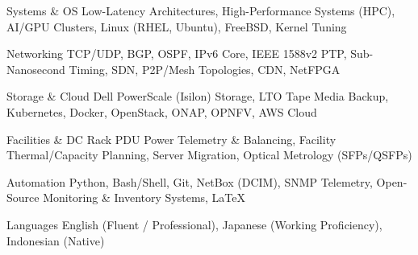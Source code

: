 

\begin{cvskills}

  \cvskill
    {Systems \& OS} %
    {Low-Latency Architectures, High-Performance Systems (HPC), AI/GPU Clusters, Linux (RHEL, Ubuntu), FreeBSD, Kernel Tuning} %

  \cvskill
    {Networking} %
    {TCP/UDP, BGP, OSPF, IPv6 Core, IEEE 1588v2 PTP, Sub-Nanosecond Timing, SDN, P2P/Mesh Topologies, CDN, NetFPGA} %

  \cvskill
    {Storage \& Cloud} %
    {Dell PowerScale (Isilon) Storage, LTO Tape Media Backup, Kubernetes, Docker, OpenStack, ONAP, OPNFV, AWS Cloud} %

  \cvskill
    {Facilities \& DC} %
    {Rack PDU Power Telemetry \& Balancing, Facility Thermal/Capacity Planning, Server Migration, Optical Metrology (SFPs/QSFPs)} %

  \cvskill
    {Automation} %
    {Python, Bash/Shell, Git, NetBox (DCIM), SNMP Telemetry, Open-Source Monitoring \& Inventory Systems, LaTeX} %

  \cvskill
    {Languages} %
    {English (Fluent / Professional), Japanese (Working Proficiency), Indonesian (Native)} %

\end{cvskills}
